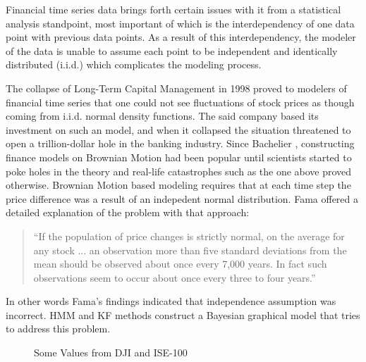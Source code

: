 Financial time series data brings forth certain issues with it from a
statistical analysis standpoint, most important of which is the interdependency
of one data point with previous data points. As a result of this
interdependency, the modeler of the data is unable to assume each point to be
independent and identically distributed (i.i.d.) which complicates the modeling
process.

The collapse of Long-Term Capital Management in 1998 proved to modelers of
financial time series that one could not see fluctuations of stock prices as
though coming from i.i.d. normal density functions. The said company based its
investment on such an model, and when it collapsed the situation threatened to
open a trillion-dollar hole in the banking industry. Since Bachelier
\cite{bachelier}, constructing finance models on Brownian Motion had been
popular until scientists started to poke holes in the theory and real-life
catastrophes such as the one above proved otherwise. Brownian Motion based
modeling requires that at each time step the price difference was a result of an
indepedent normal distribution. Fama \cite{fama} offered a detailed explanation
of the problem with that approach:

\begin{quote}
``If the population of price changes is strictly normal, on the average for any
stock ... an observation more than five standard deviations from the mean
should be observed about once every 7,000 years. In fact such observations
seem to occur about once every three to four years.''
\end{quote}

In other words Fama's findings indicated that independence assumption was
incorrect. HMM and KF methods construct a Bayesian graphical model that tries to
address this problem.

\begin{figure}[ht]
\caption{Some Values from DJI and ISE-100}
\vspace{0.6cm}
\end{figure}


